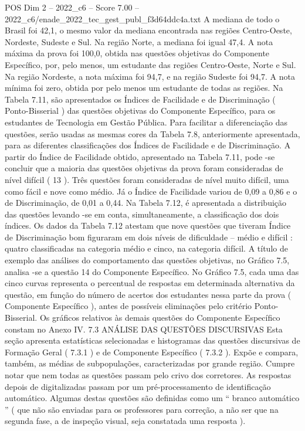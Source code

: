 \begin{textsample}{POS Dim 2 – 2022\_c6 – Score 7.00 – 2022\_c6/enade\_2022\_tec\_gest\_publ\_f3d64ddc4a.txt}
A mediana de todo o Brasil foi 42,1, o mesmo valor da mediana encontrada nas regiões Centro-Oeste, Nordeste, Sudeste e Sul.
Na região Norte, a mediana foi igual 47,4.
A nota máxima da prova foi 100,0, obtida nas questões objetivas do Componente Específico, por, pelo menos, um estudante das regiões Centro-Oeste, Norte e Sul.
Na região Nordeste, a nota máxima foi 94,7, e na região Sudeste foi 94,7.
A nota mínima foi zero, obtida por pelo menos um estudante de todas as regiões.
Na Tabela 7.11, são apresentados os Índices de Facilidade e de Discriminação ( Ponto-Bisserial ) das questões objetivas do Componente Específico, para os estudantes de Tecnologia em Gestão Pública.
Para facilitar a diferenciação das questões, serão usadas as mesmas cores da Tabela 7.8, anteriormente apresentada, para as diferentes classificações dos Índices de Facilidade e de Discriminação.
A partir do Índice de Facilidade obtido, apresentado na Tabela 7.11, pode -se concluir que a maioria das questões objetivas da prova foram consideradas de nível difícil ( 13 ).
Três questões foram consideradas de nível muito difícil, uma como fácil e nove como médio.
Já o Índice de Facilidade variou de 0,09 a 0,86 e o de Discriminação, de 0,01 a 0,44.
Na Tabela 7.12, é apresentada a distribuição das questões levando -se em conta, simultaneamente, a classificação dos dois índices.
Os dados da Tabela 7.12 atestam que nove questões que tiveram Índice de Discriminação bom figuraram em dois níveis de dificuldade – médio e difícil : quatro classificadas na categoria médio e cinco, na categoria difícil.
A título de exemplo das análises do comportamento das questões objetivas, no Gráfico 7.5, analisa -se a questão 14 do Componente Específico.
No Gráfico 7.5, cada uma das cinco curvas representa o percentual de respostas em determinada alternativa da questão, em função do número de acertos dos estudantes nessa parte da prova ( Componente Específico ), antes de possíveis eliminações pelo critério Ponto-Bisserial.
Os gráficos relativos às demais questões do Componente Específico constam no Anexo IV. 7.3 ANÁLISE DAS QUESTÕES DISCURSIVAS Esta seção apresenta estatísticas selecionadas e histogramas das questões discursivas de Formação Geral ( 7.3.1 ) e de Componente Específico ( 7.3.2 ).
Expõe e compara, também, as médias de subpopulações, caracterizadas por grande região.
Cumpre notar que nem todas as questões passam pelo crivo dos corretores.
As respostas depois de digitalizadas passam por um pré-processamento de identificação automático.
Algumas destas questões são definidas como um “ branco automático ” ( que não são enviadas para os professores para correção, a não ser que na segunda fase, a de inspeção visual, seja constatada uma resposta ).

\end{textsample}

